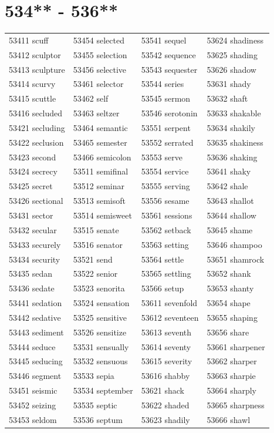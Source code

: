 \documentclass[10pt, oneside]{book}
\begin{document}
\begin{table}
	\centering
	\section*{534** - 536**}
	\begin{tabular}{l l l l}
53411 scuff &53454 selected &53541 sequel &53624 shadiness\\
53412 sculptor &53455 selection &53542 sequence &53625 shading\\
53413 sculpture &53456 selective &53543 sequester &53626 shadow\\
53414 scurvy &53461 selector &53544 series &53631 shady\\
53415 scuttle &53462 self &53545 sermon &53632 shaft\\
53416 secluded &53463 seltzer &53546 serotonin &53633 shakable\\
53421 secluding &53464 semantic &53551 serpent &53634 shakily\\
53422 seclusion &53465 semester &53552 serrated &53635 shakiness\\
53423 second &53466 semicolon &53553 serve &53636 shaking\\
53424 secrecy &53511 semifinal &53554 service &53641 shaky\\
53425 secret &53512 seminar &53555 serving &53642 shale\\
53426 sectional &53513 semisoft &53556 sesame &53643 shallot\\
53431 sector &53514 semisweet &53561 sessions &53644 shallow\\
53432 secular &53515 senate &53562 setback &53645 shame\\
53433 securely &53516 senator &53563 setting &53646 shampoo\\
53434 security &53521 send &53564 settle &53651 shamrock\\
53435 sedan &53522 senior &53565 settling &53652 shank\\
53436 sedate &53523 senorita &53566 setup &53653 shanty\\
53441 sedation &53524 sensation &53611 sevenfold &53654 shape\\
53442 sedative &53525 sensitive &53612 seventeen &53655 shaping\\
53443 sediment &53526 sensitize &53613 seventh &53656 share\\
53444 seduce &53531 sensually &53614 seventy &53661 sharpener\\
53445 seducing &53532 sensuous &53615 severity &53662 sharper\\
53446 segment &53533 sepia &53616 shabby &53663 sharpie\\
53451 seismic &53534 september &53621 shack &53664 sharply\\
53452 seizing &53535 septic &53622 shaded &53665 sharpness\\
53453 seldom &53536 septum &53623 shadily &53666 shawl\\
	\end{tabular}
 \end{table}
\clearpage
\end{document}
